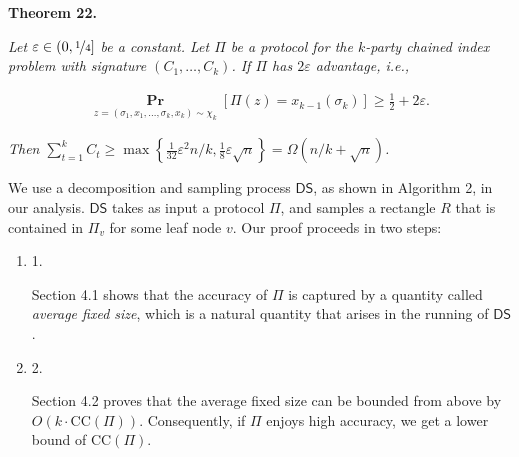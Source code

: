 

\par\medskip\noindent\textbf{
\textbf{Theorem 22}\textbf{.}
}\par



\emph{Let $\varepsilon\in(0,\nicefrac{{1}}{{4}}]$ be a constant.
Let $\Pi$ be a protocol for the $k$-party chained index problem with signature $(C_{1},\dots,C_{k})$.
If $\Pi$ has $2\varepsilon$ advantage, i.e.,}\par


\[\begin{gathered}
\operatorname*{\mathbf{Pr}}_{z=(\sigma_{1},x_{1},\dots,\sigma_{k},x_{k})\sim\chi_{k}}\left[\Pi(z)=x_{k-1}(\sigma_{k})\right]\geq\frac{1}{2}+2\varepsilon.
\end{gathered}\]


\emph{Then $\sum_{t=1}^{k}C_{t}\geq\max\left\{\frac{1}{32}\varepsilon^{2}n/k,\frac{1}{8}\varepsilon\sqrt{n}\right\}=\Omega(n/k+\sqrt{n})$.}\par






We use a decomposition and sampling process $\mathsf{DS}$, as shown in Algorithm 2, in our analysis.
$\mathsf{DS}$ takes as input a protocol $\Pi$,
and samples a rectangle $R$ that is contained in $\Pi_{v}$ for some leaf node $v$.
Our proof proceeds in two steps:\par


\begin{enumerate}


\item[] 
1. 


Section 4.1 shows that the accuracy of $\Pi$ is captured by a quantity called \emph{average fixed size}, which is a natural quantity that arises in the running of $\mathsf{DS}$.\par





\item[] 
2. 


Section 4.2 proves that the average fixed size can be bounded from above by $O(k\cdot\mathrm{CC}(\Pi))$. Consequently, if $\Pi$ enjoys high accuracy, we get a lower bound of $\mathrm{CC}(\Pi)$.\par





\end{enumerate}




